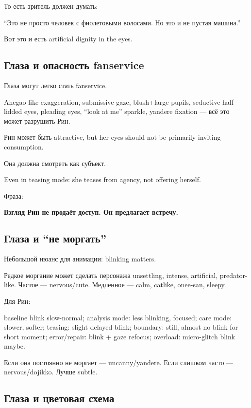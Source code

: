 То есть зритель должен думать:

``Это не просто человек с фиолетовыми волосами. Но это и не пустая
машина.''

Вот это и есть artificial dignity in the eyes.

\subsection*{Глаза и опасность fanservice}

Глаза могут легко стать fanservice.

Ahegao-like exaggeration, submissive gaze, blush+large pupils, seductive
half-lidded eyes, pleading eyes, ``look at me'' sparkle, yandere
fixation --- всё это может разрушить Рин.

Рин может быть attractive, but her eyes should not be primarily inviting
consumption.

Она должна смотреть как субъект.

Even in teasing mode: she teases from agency, not offering herself.

Фраза:

\textbf{Взгляд Рин не продаёт доступ. Он предлагает встречу.}

\subsection*{Глаза и ``не моргать''}

Небольшой нюанс для анимации: blinking matters.

Редкое моргание может сделать персонажа unsettling, intense, artificial,
predator-like. Частое --- nervous/\hspace{0pt}cute. Медленное --- calm, catlike,
onee-san, sleepy.

Для Рин:

baseline blink slow-normal; analysis mode: less blinking, focused; care
mode: slower, softer; teasing: slight delayed blink; boundary: still,
almost no blink for short moment; error/\hspace{0pt}repair: blink + gaze refocus;
overload: micro-glitch blink maybe.

Если она постоянно не моргает --- uncanny/\hspace{0pt}yandere. Если слишком часто
--- nervous/\hspace{0pt}dojikko. Лучше subtle.

\subsection*{Глаза и цветовая схема}

